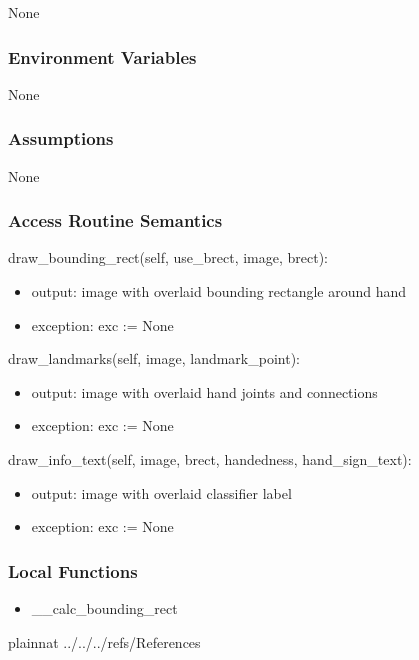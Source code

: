\documentclass[12pt, titlepage]{article}
\begin{document}
None\\

\subsubsection{Environment Variables}

None\\

\subsubsection{Assumptions}

None

\subsubsection{Access Routine Semantics}

\noindent draw\_bounding\_rect(self, use\_brect, image, brect):
\begin{itemize}
\item output: image with overlaid bounding rectangle around hand\\
\item exception: exc := None\\
\end{itemize}

\noindent draw\_landmarks(self, image, landmark\_point):
\begin{itemize}
\item output: image with overlaid hand joints and connections\\
\item exception: exc := None\\
\end{itemize}

\noindent draw\_info\_text(self, image, brect, handedness, hand\_sign\_text):
\begin{itemize}
\item output:  image with overlaid classifier label\\
\item exception: exc := None\\
\end{itemize}

\subsubsection{Local Functions}
\begin{itemize}
\item \_\_calc\_bounding\_rect\\
\end{itemize}


\newpage

 {plainnat}
 {../../../refs/References}
\end{document}
